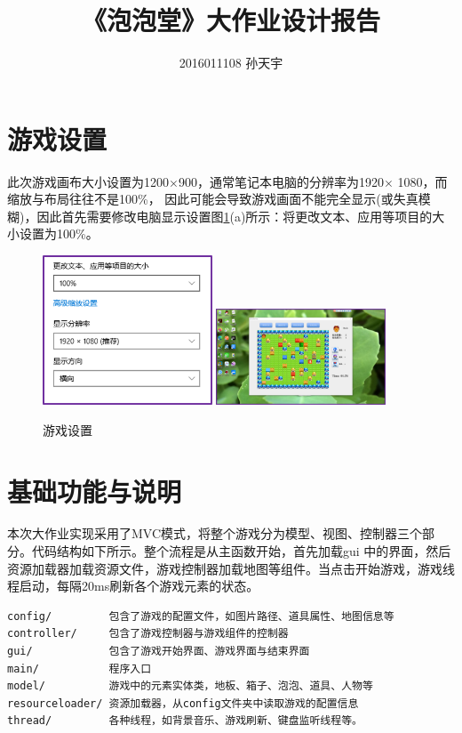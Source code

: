 \documentclass[UTF8, a4paper]{ctexart}
\title{《泡泡堂》大作业设计报告}
\author{2016011108 孙天宇}
\begin{document}
\maketitle
\section{游戏设置}
此次游戏画布大小设置为1200$ \times $900，通常笔记本电脑的分辨率为1920$\times$ 1080，而缩放与布局往往不是100\%，
因此可能会导致游戏画面不能完全显示(或失真模糊)，因此首先需要修改电脑显示设置图\ref{fig:gameSetup}(a)所示：将更改文本、应用等项目的大
小设置为100\%。
  \begin{figure}[h]
    \centering
        {\includegraphics[width=0.45\textwidth]{setup.png}}
    \hspace{0.05\textwidth}
        {\includegraphics[width=0.45\textwidth]{ui.png}}
    \caption{游戏设置}
    \label{fig:gameSetup}
  \end{figure}

\section{基础功能与说明}
本次大作业实现采用了MVC模式，将整个游戏分为模型、视图、控制器三个部分。代码结构如下所示。整个流程是从主函数开始，首先加载gui
中的界面，然后资源加载器加载资源文件，游戏控制器加载地图等组件。当点击开始游戏，游戏线程启动，每隔20ms刷新各个游戏元素的状态。
\begin{lstlisting}[style=A]
config/         包含了游戏的配置文件，如图片路径、道具属性、地图信息等  
controller/     包含了游戏控制器与游戏组件的控制器
gui/            包含了游戏开始界面、游戏界面与结束界面
main/           程序入口
model/          游戏中的元素实体类，地板、箱子、泡泡、道具、人物等
resourceloader/ 资源加载器，从config文件夹中读取游戏的配置信息  
thread/         各种线程，如背景音乐、游戏刷新、键盘监听线程等。 
\end{lstlisting}
\end{document}
